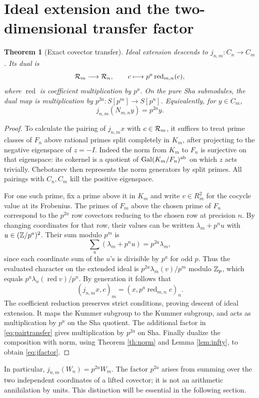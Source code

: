 \documentclass[11pt,a4paper]{article}
\newtheorem{theorem}{Theorem}[section]
\theoremstyle{definition}\newtheorem{definition}[theorem]{Definition}
\theoremstyle{remark}\newtheorem{remark}[theorem]{Remark}
\numberwithin{equation}{section}
\begin{document}
\section{Ideal extension and the two-dimensional transfer factor}
\begin{theorem}[Exact covector transfer]\label{th:transfer}
Ideal extension descends to $j_{n,m}:C_n\to C_m$. Its dual is
\[
\mathcal R_m\longrightarrow\mathcal R_n,\qquad c\longmapsto p^a\operatorname{red}_{m,n}(c),
\]
where $\operatorname{red}$ is coefficient multiplication by $p^a$. On the pure Sha submodules, the dual map is multiplication by $p^{2a}:S[p^m]\to S[p^n]$. Equivalently, for $y\in C_m$,
\begin{equation}\label{eq:jfactor}
j_{n,m}(N_{m,n}y)=p^{2a}y.
\end{equation}
\end{theorem}
\begin{proof}
To calculate the pairing of $j_{n,m}x$ with $c\in\mathcal R_m$, it suffices to treat prime classes of $F_n$ above rational primes split completely in $K_m$, after projecting to the negative eigenspace of $z=-I$. Indeed the norm from $K_m$ to $F_n$ is surjective on that eigenspace: its cokernel is a quotient of $\operatorname{Gal}(K_m/F_n)^{\rm ab}$ on which $z$ acts trivially. Chebotarev then represents the norm generators by split primes. All pairings with $C_n,C_m$ kill the positive eigenspace.

For one such prime, fix a prime above it in $K_m$ and write $v\in R_m^2$ for the cocycle value at its Frobenius. The primes of $F_m$ above the chosen prime of $F_n$ correspond to the $p^{2a}$ row covectors reducing to the chosen row at precision $n$. By changing coordinates for that row, their values can be written $\lambda_m+p^nu$ with $u\in(\mathbb Z/p^a)^2$. Their sum modulo $p^m$ is
\[
\sum_u (\lambda_m+p^nu)=p^{2a}\lambda_m,
\]
since each coordinate sum of the $u$'s is divisible by $p^a$ for odd $p$. Thus the evaluated character on the extended ideal is $p^{2a}\lambda_m(v)/p^m$ modulo $\mathbb Z_p$, which equals $p^a\lambda_n(\operatorname{red} v)/p^n$. By generation it follows that
\begin{equation}\label{eq:pairtransfer}
(j_{n,m}x,c)_m=(x,p^a\operatorname{red}_{m,n}c)_n.
\end{equation}
The coefficient reduction preserves strict conditions, proving descent of ideal extension. It maps the Kummer subgroup to the Kummer subgroup, and acts as multiplication by $p^a$ on the Sha quotient. The additional factor in \eqref{eq:pairtransfer} gives multiplication by $p^{2a}$ on Sha. Finally dualize the composition with norm, using Theorem \ref{th:norm} and Lemma \ref{lem:infty}, to obtain \eqref{eq:jfactor}.\end{proof}
In particular, $j_{n,m}(W_n)=p^{2a}W_m$. The factor $p^{2a}$ arises from summing over the two independent coordinates of a lifted covector; it is not an arithmetic annihilation by units. This distinction will be essential in the following section.
\end{document}
